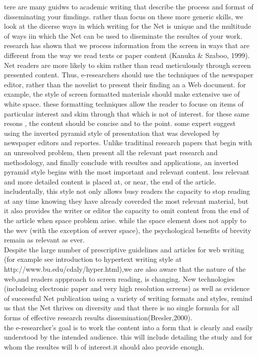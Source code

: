 \documentclass{book}
\begin{document}
tere are many guidws to academic writing that describe the process and format of disseminating 
your fimdings. rather than focus on these more generic skills, we look at the dicerse ways in which writing for the Net is unique
and the  multitude of ways iin  which the Net can be used to diseminate the resultes of your work.
research has shown that we process information from the screen in ways that are different from the way we read texts 
or paper content (Kanuka & Szaboo, 1999). Net readers are more likely to skim rather than read meticulously through screen presented content.
Thus, e-researchers should use  the techniques of the newspaper editor, rather than the novelist to present their finding an a Web document.
for example, the style of screen formatted materials should make extensive use of white space.
these formatting techniques allow the reader to focuse on items of particular interest and skim through that which is not of interest.
for these same resons , the content should be concise and to the point.
some expert suggest using the inverted pyramid style of presentation that was developed by newspaper editors and reportes.
Unlike traditinal research papers that begin with an unresolved problem, then present
all the  relevant past research and methodology, and finally conclude with resultes and applications, an  inverted
pyramid style begins with the most important and relevant content. less relevant and more detailed content is placed at, or near,
the end of the article. includentally, this  style  not only allows busy readers the capacity to stop reading at any time knowing they 
have already coverded the most relevant material, but it also provides the writer or editor the capacity to omit
content from the end of the article when space problem arise.
while the space element does not apply to the wev (with the exception of server space), the psychological benefits of 
brevity remain as relevant as ever.\\
Despite the large number of prescriptive  guidelines and articles for web writing 
(for example see introduction to hypertext writing style at http://www.bu.edu/cdaly/hyper.html),we are also  aware that the nature of the 
web,and readers appproach to screen reading, is changing. New technologies (includeing electronic paper and very high resolution screens)
as well as evidence of successful Net publication using a variety of  writing formats and styles, remind us that the Net thrives on diversity and that 
there is no single formula for all forms of effective research results dissemination(Bresler,2000).\\
the e-researcher's goal is to work the content into a form that is clearly and easily understood by the intended audience. this will include
detailing the study and for whom the resultes will b of interest.it should also provide enough.\\
\end{document}
